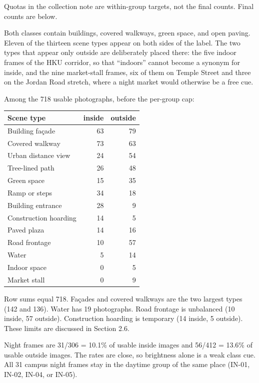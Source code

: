 \documentclass[11pt,a4paper]{article}
\newcounter{none}
\begin{document}
Quotas in the collection note are within-group targets, not the final counts. Final counts are below.

Both classes contain buildings, covered walkways, green space, and open paving. Eleven of the thirteen scene types appear on both sides of the label. The two types that appear only outside are deliberately placed there: the five indoor frames of the HKU corridor, so that ``indoors'' cannot become a synonym for inside, and the nine market-stall frames, six of them on Temple Street and three on the Jordan Road stretch, where a night market would otherwise be a free cue.

Among the 718 usable photographs, before the per-group cap:

{\def\LTcaptype{none} %
\begin{longtable}[]{@{}lrr@{}}
\toprule\noalign{}
Scene type & inside & outside \\
\midrule\noalign{}
\endhead
\bottomrule\noalign{}
\endlastfoot
Building façade & 63 & 79 \\
Covered walkway & 73 & 63 \\
Urban distance view & 24 & 54 \\
Tree-lined path & 26 & 48 \\
Green space & 15 & 35 \\
Ramp or steps & 34 & 18 \\
Building entrance & 28 & 9 \\
Construction hoarding & 14 & 5 \\
Paved plaza & 14 & 16 \\
Road frontage & 10 & 57 \\
Water & 5 & 14 \\
Indoor space & 0 & 5 \\
Market stall & 0 & 9 \\
\end{longtable}
}

Row sums equal 718. Façades and covered walkways are the two largest types (142 and 136). Water has 19 photographs. Road frontage is unbalanced (10 inside, 57 outside). Construction hoarding is temporary (14 inside, 5 outside). These limits are discussed in Section 2.6.

Night frames are 31/306 = 10.1\% of usable inside images and 56/412 = 13.6\% of usable outside images. The rates are close, so brightness alone is a weak class cue. All 31 campus night frames stay in the daytime group of the same place (IN-01, IN-02, IN-04, or IN-05).
\end{document}
